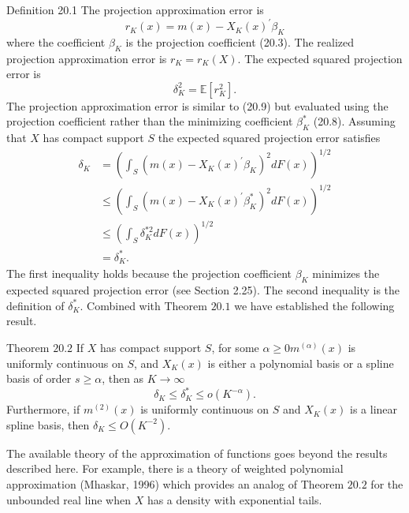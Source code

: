 \documentclass[10pt]{article}
\begin{document}
Definition 20.1 The projection approximation error is
$$
r_{K}(x)=m(x)-X_{K}(x)^{\prime} \beta_{K}
$$
where the coefficient $\beta_{K}$ is the projection coefficient (20.3). The realized projection approximation error is $r_{K}=r_{K}(X)$. The expected squared projection error is
$$
\delta_{K}^{2}=\mathbb{E}\left[r_{K}^{2}\right] .
$$
The projection approximation error is similar to (20.9) but evaluated using the projection coefficient rather than the minimizing coefficient $\beta_{K}^{*}$ (20.8). Assuming that $X$ has compact support $S$ the expected squared projection error satisfies
$$
\begin{aligned}
\delta_{K} &=\left(\int_{S}\left(m(x)-X_{K}(x)^{\prime} \beta_{K}\right)^{2} d F(x)\right)^{1 / 2} \\
& \leq\left(\int_{S}\left(m(x)-X_{K}(x)^{\prime} \beta_{K}^{*}\right)^{2} d F(x)\right)^{1 / 2} \\
& \leq\left(\int_{S} \delta_{K}^{* 2} d F(x)\right)^{1 / 2} \\
&=\delta_{K}^{*} .
\end{aligned}
$$
The first inequality holds because the projection coefficient $\beta_{K}$ minimizes the expected squared projection error (see Section 2.25). The second inequality is the definition of $\delta_{K}^{*}$. Combined with Theorem $20.1$ we have established the following result.

Theorem $20.2$ If $X$ has compact support $S$, for some $\alpha \geq 0 m^{(\alpha)}(x)$ is uniformly continuous on $S$, and $X_{K}(x)$ is either a polynomial basis or a spline basis of order $s \geq \alpha$, then as $K \rightarrow \infty$
$$
\delta_{K} \leq \delta_{K}^{*} \leq o\left(K^{-\alpha}\right) .
$$
Furthermore, if $m^{(2)}(x)$ is uniformly continuous on $S$ and $X_{K}(x)$ is a linear spline basis, then $\delta_{K} \leq O\left(K^{-2}\right)$.

The available theory of the approximation of functions goes beyond the results described here. For example, there is a theory of weighted polynomial approximation (Mhaskar, 1996) which provides an analog of Theorem $20.2$ for the unbounded real line when $X$ has a density with exponential tails.
\end{document}
